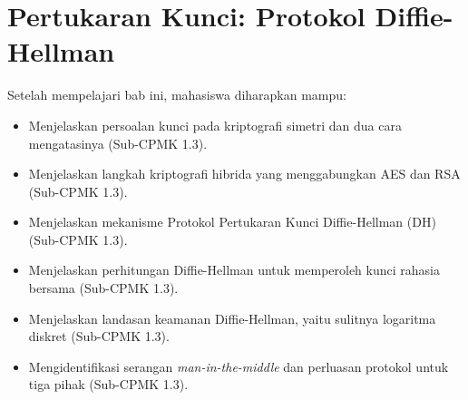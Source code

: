 \documentclass[../../main.tex]{subfiles}
\begin{document}
\chapter{Pertukaran Kunci: Protokol Diffie-Hellman}
\label{chap:diffie-hellman}

\begin{learningoutcome}
Setelah mempelajari bab ini, mahasiswa diharapkan mampu:
\begin{itemize}
    \item Menjelaskan persoalan kunci pada kriptografi simetri dan dua cara mengatasinya (Sub-CPMK 1.3).
    \item Menjelaskan langkah kriptografi hibrida yang menggabungkan AES dan RSA (Sub-CPMK 1.3).
    \item Menjelaskan mekanisme Protokol Pertukaran Kunci Diffie-Hellman (DH) (Sub-CPMK 1.3).
    \item Menjelaskan perhitungan Diffie-Hellman untuk memperoleh kunci rahasia bersama (Sub-CPMK 1.3).
    \item Menjelaskan landasan keamanan Diffie-Hellman, yaitu sulitnya logaritma diskret (Sub-CPMK 1.3).
    \item Mengidentifikasi serangan \textit{man-in-the-middle} dan perluasan protokol untuk tiga pihak (Sub-CPMK 1.3).
\end{itemize}
\end{learningoutcome}










\end{document}
